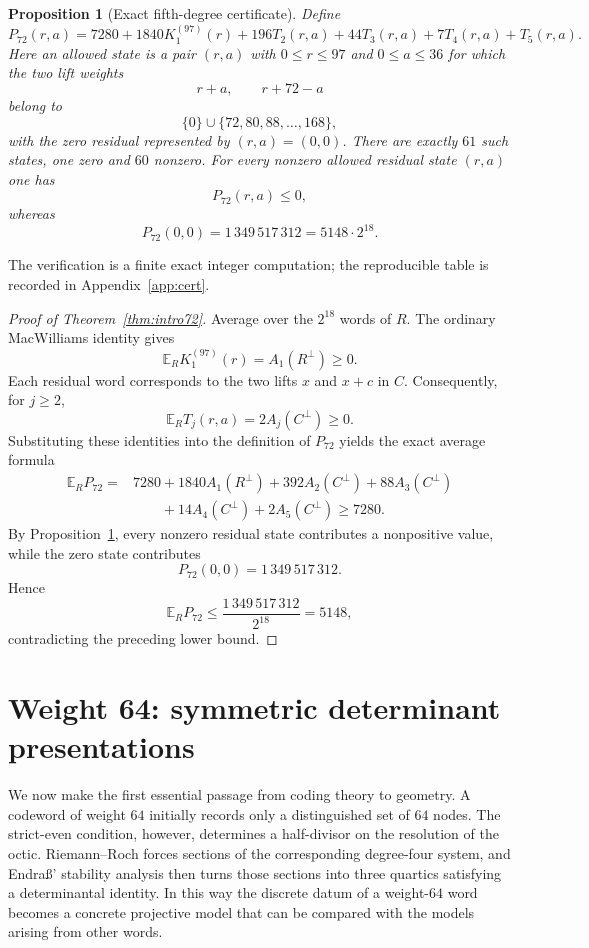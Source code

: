 \documentclass[11pt,reqno]{amsart}
\newtheorem{proposition}[theorem]{Proposition}
\theoremstyle{remark}
\begin{document}
\begin{proposition}[Exact fifth-degree certificate]\label{prop:cert72}
Define
\[
P_{72}(r,a)=7280+1840K_1^{(97)}(r)+196T_2(r,a)+44T_3(r,a)+7T_4(r,a)+T_5(r,a).
\]
Here an allowed state is a pair $(r,a)$ with $0\le r\le97$ and $0\le a\le36$ for which the two lift weights
\[
r+a,\qquad r+72-a
\]
belong to
\[
\{0\}\cup\{72,80,88,\ldots,168\},
\]
with the zero residual represented by $(r,a)=(0,0)$.  There are exactly $61$ such states, one zero and $60$ nonzero.  For every nonzero allowed residual state $(r,a)$ one has
\[
P_{72}(r,a)\le0,
\]
whereas
\[
P_{72}(0,0)=1\,349\,517\,312=5148\cdot2^{18}.
\]
\end{proposition}

The verification is a finite exact integer computation; the reproducible table is recorded in Appendix~\ref{app:cert}.

\begin{proof}[Proof of Theorem~\ref{thm:intro72}]
Average over the $2^{18}$ words of $R$.  The ordinary MacWilliams identity gives
\[
\mathbb E_R K_1^{(97)}(r)=A_1(R^\perp)\ge0.
\]
Each residual word corresponds to the two lifts $x$ and $x+c$ in $C$.  Consequently, for $j\ge2$,
\[
\mathbb E_R T_j(r,a)
=2A_j(C^\perp)\ge0.
\]
Substituting these identities into the definition of $P_{72}$ yields the exact average formula
\[
\begin{aligned}
\mathbb E_RP_{72}
={}&7280+1840A_1(R^\perp)+392A_2(C^\perp)+88A_3(C^\perp)\\
&\qquad+14A_4(C^\perp)+2A_5(C^\perp)
\ge7280.
\end{aligned}
\]
By Proposition~\ref{prop:cert72}, every nonzero residual state contributes a nonpositive value, while the zero state contributes
\[
P_{72}(0,0)=1\,349\,517\,312.
\]
Hence
\[
\mathbb E_RP_{72}
\le\frac{1\,349\,517\,312}{2^{18}}=5148,
\]
contradicting the preceding lower bound.
\end{proof}

\section{Weight 64: symmetric determinant presentations}\label{sec:det64}
We now make the first essential passage from coding theory to geometry.  A codeword of weight $64$ initially records only a distinguished set of $64$ nodes.  The strict-even condition, however, determines a half-divisor on the resolution of the octic.  Riemann--Roch forces sections of the corresponding degree-four system, and Endra\ss' stability analysis then turns those sections into three quartics satisfying a determinantal identity.  In this way the discrete datum of a weight-$64$ word becomes a concrete projective model that can be compared with the models arising from other words.
\end{document}
